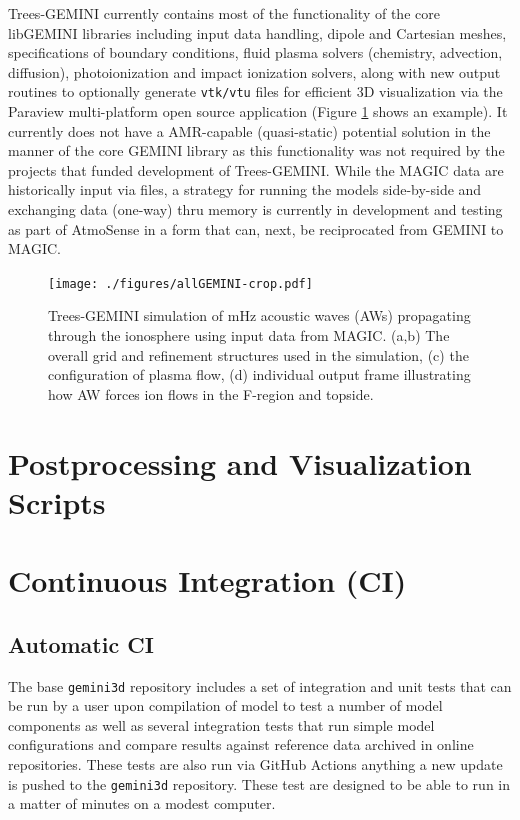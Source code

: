\documentclass[11pt,letterpaper]{article}
\begin{document}
Trees-GEMINI currently contains most of the functionality of the core libGEMINI libraries including input data handling, dipole and Cartesian meshes, specifications of boundary conditions, fluid plasma solvers (chemistry, advection, diffusion), photoionization and impact ionization solvers, along with new output routines to optionally generate \texttt{vtk/vtu} files for efficient 3D visualization via the Paraview multi-platform open source application (Figure \ref{fig:Trees-GEMINI} shows an example).  It currently does not have a AMR-capable (quasi-static) potential solution in the manner of the core GEMINI library as this functionality was not required by the projects that funded development of Trees-GEMINI.  While the MAGIC data are historically input via files, a strategy for running the models side-by-side and exchanging data (one-way) thru memory is currently in development and testing as part of AtmoSense in a form that can, next, be reciprocated from GEMINI to MAGIC.  %
\begin{figure}
  \texttt{[image: ./figures/allGEMINI-crop.pdf]}
  \caption{Trees-GEMINI simulation of mHz acoustic waves (AWs) propagating through the ionosphere using input data from MAGIC.  (a,b) The overall grid and refinement structures used in the simulation, (c) the configuration of plasma flow, (d) individual output frame illustrating how AW forces ion flows in the F-region and topside.}
  \label{fig:Trees-GEMINI}
\end{figure}



\section{Postprocessing and Visualization Scripts}




\section{Continuous Integration (CI)}

\subsection{Automatic CI}

The base \texttt{gemini3d} repository includes a set of integration and unit tests that can be run by a user upon compilation of model to test a number of model components as well as several integration tests that run simple model configurations and compare results against reference data archived in online repositories.  These tests are also run via GitHub Actions anything a new update is pushed to the \texttt{gemini3d} repository.  These test are designed to be able to run in a matter of minutes on a modest computer.  
\end{document}
